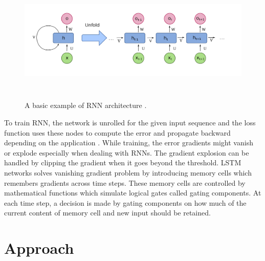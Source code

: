 \documentclass[a4paper, 11pt]{article}
\begin{document}


\begin{figure}[htpb]
    \centering
    \includegraphics[width=\textwidth,height=6cm,keepaspectratio=true]
    {Recurrent_neural_network_unfold.png}
    \caption{
        A basic example of RNN architecture \cite{WikipediaEN_RNN_unfold}.
    }
    \label{fig:A basic RNN architecture}
\end{figure}

To train RNN, the network is unrolled for the given input sequence and the loss function uses these nodes to compute the error and propagate backward depending on the application \cite{Werbos1990}. While training, the error gradients might vanish or explode especially when dealing with RNNs. The gradient explosion can be handled by clipping the gradient when it goes beyond the threshold. LSTM networks \cite{Hochreiter1997} solves vanishing gradient problem by introducing memory cells which remembers gradients across time steps. These memory cells are controlled by mathematical functions which simulate logical gates called gating components. At each time step, a decision is made by gating components on how much of the current content of memory cell and new input should be retained. 


\section{Approach}
\end{document}
